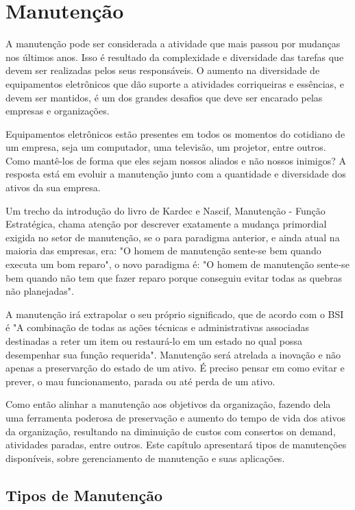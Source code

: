 \chapter{Manutenção}
\label{cap-manutencao}

A manutenção pode ser considerada a atividade que mais passou por mudanças nos últimos anos. Isso é resultado da complexidade e diversidade das tarefas que devem ser realizadas pelos seus responsáveis. O aumento na diversidade de equipamentos eletrônicos que dão suporte a atividades corriqueiras e essências, e devem ser mantidos, é um dos grandes desafios que deve ser encarado pelas empresas e organizações.

Equipamentos eletrônicos estão presentes em todos os momentos do cotidiano de um empresa, seja um computador, uma televisão, um projetor, entre outros. Como mantê-los de forma que eles sejam nossos aliados e não nossos inimigos? A resposta está em evoluir a manutenção junto com a quantidade e diversidade dos ativos da sua empresa.
	
Um trecho da introdução do livro de Kardec e Nascif, Manutenção - Função Estratégica, chama atenção por descrever exatamente a mudança primordial exigida no setor de manutenção, se o para paradigma anterior, e ainda atual na maioria das empresas, era: "O homem de manutenção sente-se bem quando executa um bom reparo", o novo paradigma é: "O homem de manutenção sente-se bem  quando não tem que fazer reparo porque conseguiu evitar todas as quebras não planejadas".
	
A manutenção irá extrapolar o seu próprio significado, que de acordo com o BSI \cite{british1993bs} é "A combinação de todas as ações técnicas e administrativas associadas destinadas a reter um item ou restaurá-lo em um estado no qual possa desempenhar sua função requerida". Manutenção será atrelada a inovação e não apenas a preservarção do estado de um ativo. É preciso pensar em como evitar e prever, o mau funcionamento, parada ou até perda de um ativo.
	
Como então alinhar a manutenção aos objetivos da organização, fazendo dela uma ferramenta poderosa de preservação e aumento do tempo de vida dos ativos da organização, resultando na diminuição de custos com consertos on demand, atividades paradas, entre outros. Este capítulo apresentará tipos de manutenções disponíveis, sobre gerenciamento de manutenção e suas aplicações.


\section{Tipos de Manutenção}


